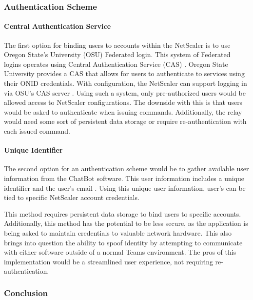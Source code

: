 \subsubsection{Authentication Scheme}
\paragraph{Central Authentication Service}
The first option for binding users to accounts within the NetScaler is to use Oregon State's University (OSU) Federated login.
This system of Federated logins operates using Central Authentication Service (CAS) \cite{osucas}.
Oregon State University provides a CAS that allows for users to authenticate to services using their ONID credentials.
With configuration, the NetScaler can support logging in via OSU's CAS server \cite{nitro}.
Using such a system, only pre-authorized users would be allowed access to NetScaler configurations.
The downside with this is that users would be asked to authenticate when issuing commands.
Additionally, the relay would need some sort of persistent data storage or require re-authentication with each issued command.

\paragraph{Unique Identifier}
The second option for an authentication scheme would be to gather available user information from the ChatBot software.
This user information includes a unique identifier and the user's email \cite{teamscontext}.
Using this unique user information, user's can be tied to specific NetScaler account credentials.

This method requires persistent data storage to bind users to specific accounts.
Additionally, this method has the potential to be less secure, as the application is being asked to maintain credentials to valuable network hardware.
This also brings into question the ability to spoof identity by attempting to communicate with either software outside of a normal Teams environment.
The pros of this implementation would be a streamlined user experience, not requiring re-authentication. 

\subsubsection{Conclusion}

